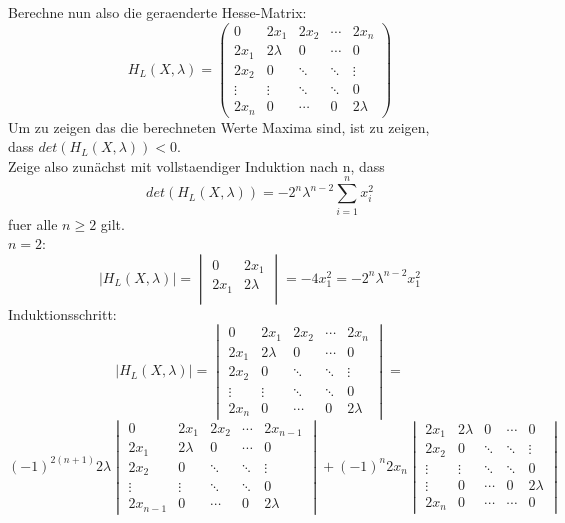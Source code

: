 \documentclass[11pt]{scrartcl}
\begin{document}
			Berechne nun also die geraenderte Hesse-Matrix:
			$$
			H_{L}(X,\lambda)=
			\left(
			\begin{array}{ccccc}
				0 & 2x_{1} & 2x_{2} & \cdots & 2x_{n} \\
				2x_{1} & 2\lambda & 0 & \cdots & 0 \\
				2x_{2} & 0 & \ddots & \ddots & \vdots \\
				\vdots & \vdots & \ddots & \ddots & 0 \\
				2x_{n} &  0 & \cdots & 0 & 2\lambda
			\end{array}
			\right)
			$$
			Um zu zeigen das die berechneten Werte Maxima sind, ist zu zeigen,\\ dass \(det(H_{L}(X,\lambda))<0\).\\
			Zeige also zunächst mit vollstaendiger Induktion nach n, dass
			$$
			det(H_{L}(X,\lambda))=-2^n\lambda^{n-2}\sum_{i=1}^{n}x_{i}^2
			$$
			fuer alle \(n\geq2\) gilt.\\
			\(n=2\):
			$$
			|H_{L}(X,\lambda)|=
			\begin{vmatrix}
				0 & 2x_{1} \\
				2x_{1} & 2\lambda\\
			\end{vmatrix}
			=-4x_{1}^2=-2^n\lambda^{n-2}x_{1}^2
			$$
			Induktionsschritt:
			$$
			|H_{L}(X,\lambda)|=
			\begin{vmatrix}
				0 & 2x_{1} & 2x_{2} & \cdots & 2x_{n} \\
				2x_{1} & 2\lambda & 0 & \cdots & 0 \\
				2x_{2} & 0 & \ddots & \ddots & \vdots \\
				\vdots & \vdots & \ddots & \ddots & 0 \\
				2x_{n} &  0 & \cdots & 0 & 2\lambda
			\end{vmatrix}
			=
			$$
			$$
			(-1)^{2(n+1)}2\lambda
			\begin{vmatrix}
			0 & 2x_{1} & 2x_{2} & \cdots & 2x_{n-1} \\
			2x_{1} & 2\lambda & 0 & \cdots & 0 \\
			2x_{2} & 0 & \ddots & \ddots & \vdots \\
			\vdots & \vdots & \ddots & \ddots & 0 \\
			2x_{n-1} &  0 & \cdots & 0 & 2\lambda
			\end{vmatrix}
			+(-1)^{n}2x_{n}
			\begin{vmatrix}
			2x_{1} & 2\lambda & 0 & \cdots & 0 \\
			2x_{2} & 0 & \ddots & \ddots & \vdots \\
			\vdots & \vdots & \ddots & \ddots & 0 \\
			\vdots & 0 & \cdots & 0 & 2\lambda \\
			2x_{n} &  0 & \cdots & \cdots & 0
			\end{vmatrix}
			$$
\end{document}
